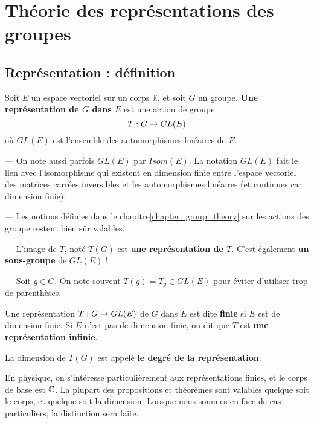 \chapter{Théorie des représentations des groupes}

\section{Représentation : définition}
\begin{definition}
	Soit $E$ un espace vectoriel sur un corps $\mathbb{K}$, et soit $G$ un groupe.
	\textbf{Une représentation de $G$ dans $E$} est une action de groupe
	\begin{equation}
		T : G \rightarrow GL(E)
		\label{definition_representation}
	\end{equation}
	où $GL(E)$ est l'ensemble des automorphismes linéaires de $E$.
\end{definition}

\begin{remarque}
	--- On note aussi parfois $GL(E)$ par $Isom(E)$. La notation $GL(E)$ fait le
	lien avec l'isomorphisme qui existent en dimension finie entre l'espace
	vectoriel des matrices carrées inversibles et les automorphismes linéaires
	(et continues car dimension finie).

	--- Les notions définies dans le chapitre\ref{chapter_group_theory} sur les
	actions des groupe restent bien sûr valables.

	--- L'image de $T$, noté $T(G)$ est \textbf{une représentation de $T$}.
	C'est également \textbf{un sous-groupe} de $GL(E)$ !

	--- Soit $g \in G$. On note souvent $T(g) = T_{g} \in GL(E)$ pour éviter
	d'utiliser trop de parenthèses.
\end{remarque}

\begin{definition}
	Une représentation $T : G \rightarrow GL(E)$ de $G$ dans $E$ est dite
	\textbf{finie} si $E$ est de dimension finie. Si $E$ n'est pas de dimension
	finie, on dit que $T$ est \textbf{une représentation infinie}.

	La dimension de $T(G)$ est appelé \textbf{le degré de la représentation}.
\end{definition}

En physique, on s'intéresse particulièrement aux représentations finies, et le
corps de base est $\mathbb{C}$. La plupart des propositions et théorèmes sont
valables quelque soit le corps, et quelque soit la dimension.
Lorsque nous sommes en face de cas particuliers, la distinction sera faite.

